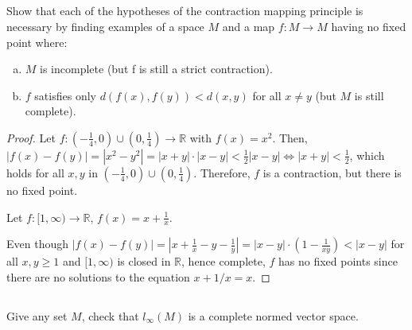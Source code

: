 \subsection{} Show that each of the hypotheses of the contraction mapping principle is necessary by finding examples of a space $M$ and a map $f: M \rightarrow M$ having no fixed point where:
\begin{enumerate}[a)]
    \item $M$ is incomplete (but f is still a strict contraction).
    \item $f$ satisfies only $d(f(x), f(y)) < d(x, y)$ for all $x \neq y$ (but $M$ is still complete). 
\end{enumerate}

\begin{proof}
Let $f:(-\frac{1}{4}, 0) \cup (0, \frac{1}{4}) \rightarrow \mathbb{R}$ with $f(x) = x^2$. Then, $|f(x) - f(y)| = |x^2 - y^2| = |x+y|\cdot|x-y| < \frac{1}{2}|x-y| \Leftrightarrow |x+y| < \frac{1}{2}$, which holds for all $x,y$ in $(-\frac{1}{4}, 0) \cup (0, \frac{1}{4})$. Therefore, $f$ is a contraction, but there is no fixed point.

\vspace{1em}

Let $f:[1,\infty) \rightarrow \mathbb{R}$, $f(x) = x+\frac{1}{x}$. 

Even though $|f(x) - f(y)| = |x + \frac{1}{x} - y - \frac{1}{y}| = |x-y| \cdot (1 - \frac{1}{xy}) < |x-y|$ for all $x,y \geq 1$ and $[1, \infty)$ is closed in $\mathbb{R}$, hence complete, $f$ has no fixed points since there are no solutions to the equation $x + 1/x = x$.

\end{proof}

\subsection{} Give any set $M$, check that $l_\infty(M)$ is a complete normed vector space.

